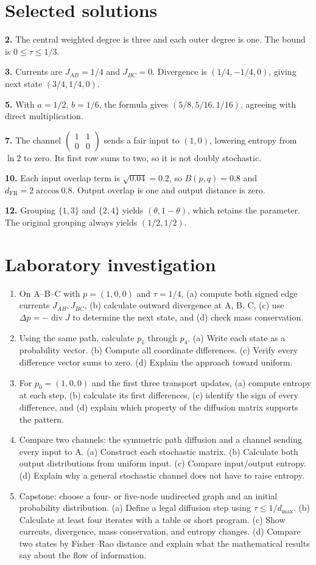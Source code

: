 \documentclass[11pt,oneside,openany]{book}
\theoremstyle{definition}
\theoremstyle{remark}
\numberwithin{equation}{chapter}
\providecommand{\tightlist}{\setlength{\itemsep}{0pt}\setlength{\parskip}{0pt}}
\newcommand{\labheading}{\FloatBarrier\section*{Laboratory investigation}\addcontentsline{toc}{section}{Laboratory investigation}}
\begin{document}
\section{Selected solutions}\label{ch10-selected-solutions}

\textbf{2.} The central weighted degree is three and each outer degree is one. The bound is \(0\leq\tau\leq1/3\).

\textbf{3.} Currents are \(J_{AB}=1/4\) and \(J_{BC}=0\). Divergence is \((1/4,-1/4,0)\), giving next state \((3/4,1/4,0)\).

\textbf{5.} With \(a=1/2\), \(b=1/6\), the formula gives \((5/8,5/16,1/16)\), agreeing with direct multiplication.

\textbf{7.} The channel \(\left(\begin{smallmatrix}1&1\\0&0\end{smallmatrix}\right)\) sends a fair input to \((1,0)\), lowering entropy from \(\ln2\) to zero. Its first row sums to two, so it is not doubly stochastic.

\textbf{10.} Each input overlap term is \(\sqrt{0.04}=0.2\), so \(B(p,q)=0.8\) and \(d_{\mathrm{FR}}=2\arccos0.8\). Output overlap is one and output distance is zero.

\textbf{12.} Grouping \(\{1,3\}\) and \(\{2,4\}\) yields \((\theta,1-\theta)\), which retains the parameter. The original grouping always yields \((1/2,1/2)\).
\labheading\begin{enumerate}
\def\labelenumi{\arabic{enumi}.}
\tightlist
\item
  On A--B--C with \(p=(1,0,0)\) and \(\tau=1/4\), (a) compute both signed edge currents \(J_{AB},J_{BC}\), (b) calculate outward divergence at A, B, C, (c) use \(\Delta p=-\operatorname{div}J\) to determine the next state, and (d) check mass conservation.
\item
  Using the same path, calculate \(p_1\) through \(p_4\). (a) Write each state as a probability vector. (b) Compute all coordinate differences. (c) Verify every difference vector sums to zero. (d) Explain the approach toward uniform.
\item
  For \(p_0=(1,0,0)\) and the first three transport updates, (a) compute entropy at each step, (b) calculate its first differences, (c) identify the sign of every difference, and (d) explain which property of the diffusion matrix supports the pattern.
\item
  Compare two channels: the symmetric path diffusion and a channel sending every input to A. (a) Construct each stochastic matrix. (b) Calculate both output distributions from uniform input. (c) Compare input/output entropy. (d) Explain why a general stochastic channel does not have to raise entropy.
\item
  Capstone: choose a four- or five-node undirected graph and an initial probability distribution. (a) Define a legal diffusion step using \(\tau\leq1/d_{\max}\). (b) Calculate at least four iterates with a table or short program. (c) Show currents, divergence, mass conservation, and entropy changes. (d) Compare two states by Fisher--Rao distance and explain what the mathematical results say about the flow of information.
\end{enumerate}

\FloatBarrier
\end{document}
